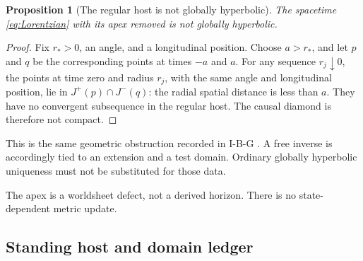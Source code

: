 \documentclass[11pt,a4paper]{article}
\newcommand{\loc}[1]{\nolinkurl{#1}}
\theoremstyle{plain}
\newtheorem{proposition}[theorem]{Proposition}
\theoremstyle{definition}
\theoremstyle{remark}
\numberwithin{equation}{section}
\begin{document}
\begin{proposition}[The regular host is not globally hyperbolic]
\label{prop:nonGH}
The spacetime \eqref{eq:Lorentzian} with its apex removed is not
globally hyperbolic.
\end{proposition}

\begin{proof}
Fix \(r_*>0\), an angle, and a longitudinal position. Choose
\(a>r_*\), and let \(p\) and \(q\) be the corresponding points at
times \(-a\) and \(a\).
For any sequence \(r_j\downarrow0\), the points at time zero and
radius \(r_j\), with the same angle and longitudinal position,
lie in \(J^+(p)\cap J^-(q)\): the radial spatial distance is
less than \(a\).
They have no convergent subsequence in the regular host.
The causal diamond is therefore not compact.
\end{proof}

This is the same geometric obstruction recorded in I-B-G
\cite[\loc{prop:nonGH}]{CheungIBG}. A free inverse is accordingly
tied to an extension and a test domain. Ordinary globally
hyperbolic uniqueness must not be substituted for those data.

The apex is a worldsheet defect, not a derived horizon. There is
no state-dependent metric update.

\subsection{Standing host and domain ledger}
\end{document}
